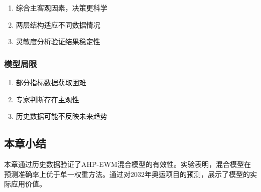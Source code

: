 \begin{enumerate}
\item 综合主客观因素，决策更科学
\item 两层结构适应不同数据情况
\item 灵敏度分析验证结果稳定性
\end{enumerate}

\subsubsection{模型局限}

\begin{enumerate}
\item 部分指标数据获取困难
\item 专家判断存在主观性
\item 历史数据可能不反映未来趋势
\end{enumerate}

\subsection{本章小结}

本章通过历史数据验证了AHP-EWM混合模型的有效性。实验表明，混合模型在预测准确率上优于单一权重方法。通过对2032年奥运项目的预测，展示了模型的实际应用价值。